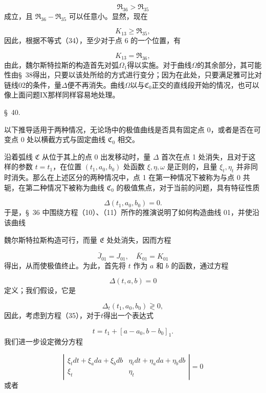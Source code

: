 \documentclass[11pt,a4paper,leqno]{article}
\begin{document}
\[
\mathfrak{R}_{36}>\mathfrak{R}_{35}
\]
成立，且 $\mathfrak{R}_{36}-\mathfrak{R}_{35}$ 可以任意小。显然，现在

\[
K_{13}\geq \mathfrak{R}_{35},
\]
因此，根据不等式（34），至少对于点 6 的一个位置，有

\[
K_{13}=\mathfrak{R}_{36},
\]
由此，魏尔斯特拉斯的构造首先对弧$\Omega_1$得以实施。对于曲线$\Omega$的其余部分，其可能性由\S~38得出，只要以该处所给的方式进行变分；因为在此处，只要满足雅可比对链线02的条件，量$\Delta$便不再消失。曲线$\Omega$以与$\mathfrak{C}_0$正交的直线段开始的情况，也可以像上面问题IX那样同样容易地处理。

\begin{center}
{\large \S~40.}
\end{center}
以下推导适用于两种情况，无论场中的极值曲线是否具有固定点 0，或者是否在可变点 0 处以横截方式与固定曲线 $\mathfrak{C}_0$ 相交。

沿着弧线 $\mathfrak{C}$ 从位于其上的点 0 出发移动时，量 $\Delta$ 首次在点 1 处消失，且对于这样的参数 $t=t_1$，在位置 $(t_1,a_0,b_0)$ 处函数 $\xi,\eta,\omega$ 是正则的，且量 $\xi_t,\eta_t$ 并非同时消失。那么在上述区分的两种情况中，点 1 在第一种情况下被称为与点 0 共轭，在第二种情况下被称为曲线 $\mathfrak{C}_0$ 的极值焦点，对于当前的问题，具有特征性质

\begin{equation}\tag{35}
\Delta(t_1,a_0,b_0)=0.
\end{equation}
于是，\S~36 中围绕方程（10）、（11）所作的推演说明了如何构造曲线 01，并使沿该曲线

魏尔斯特拉斯构造可行，而量 $\mathfrak{E}$ 处处消失，因而方程

\begin{equation}\tag{36}
\bar J_{01}=J_{01},\quad \bar K_{01}=K_{01}
\end{equation}
得出，从而使极值终止。为此，首先将 $t$ 作为 $a$ 和 $b$ 的函数，通过方程

\begin{equation}\tag{37}
\Delta(t,a,b)=0
\end{equation}
定义；我们假设，它是

\[
\Delta_t(t_1,a_0,b_0)\gtrless 0,
\]
因此，考虑到方程（35），对于$t$得出一个表达式

\[
t=t_1+[a-a_0,b-b_0]_1.
\]
我们进一步设定微分方程

\[
\left|\begin{array}{cc}
\xi_tdt+\xi_a da+\xi_b db&\eta_tdt+\eta_a da+\eta_b db\\[.6ex]
\xi_t&\eta_t
\end{array}\right|=0
\]
或者
\end{document}
